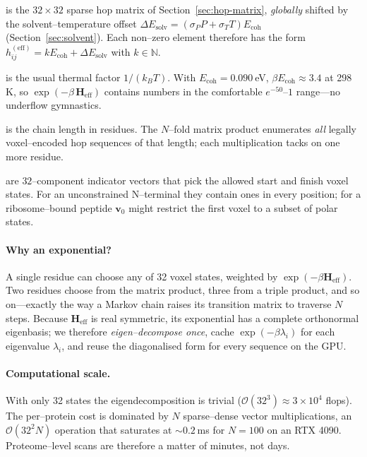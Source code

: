 \documentclass[11pt]{article}
\newcommand{\Eoh}{E_{\mathrm{coh}}}          %
\begin{document}
\begin{description}\setlength\itemsep{3pt}
\item[$\mathbf H_{\text{eff}}$] is the $32\times32$ sparse hop matrix of
      Section~\ref{sec:hop-matrix}, \emph{globally} shifted by the
      solvent–temperature offset
      $\Delta E_{\text{solv}}=(\sigma_{P}P+\sigma_{T}T)\Eoh$
      (Section~\ref{sec:solvent}).
      Each non–zero element therefore has the form
      $h_{ij}^{(\text{eff})}=k\Eoh+\Delta E_{\text{solv}}$ with
      $k\in\mathbb N$.

\item[$\beta$] is the usual thermal factor $1/(k_{B}T)$.  With
      $\Eoh=0.090$ eV, $\beta\Eoh\approx3.4$ at 298 K, so
      $\exp(-\beta\,\mathbf H_{\text{eff}})$ contains numbers in the
      comfortable $e^{-50}\text{–}1$ range—no underflow gymnastics.

\item[$N$] is the chain length in residues.  The $N$–fold matrix product
      enumerates \emph{all} legally voxel–encoded hop sequences of that
      length; each multiplication tacks on one more residue.

\item[$\mathbf v_{0}$, $\mathbf v_{f}$] are $32$–component indicator
      vectors that pick the allowed start and finish voxel states.  For
      an unconstrained N–terminal they contain ones in every position;
      for a ribosome–bound peptide $\mathbf v_{0}$ might restrict the
      first voxel to a subset of polar states.

\end{description}

\paragraph{Why an exponential?}
A single residue can choose any of 32 voxel states, weighted by
$\exp(-\beta\mathbf H_{\text{eff}})$.  Two residues choose from the
matrix product, three from a triple product, and so on—exactly the way a
Markov chain raises its transition matrix to traverse $N$ steps.
Because $\mathbf H_{\text{eff}}$ is real symmetric, its exponential has
a complete orthonormal eigenbasis; we therefore \emph{eigen–decompose
once}, cache $\exp(-\beta\lambda_{i})$ for each eigenvalue $\lambda_{i}$,
and reuse the diagonalised form for every sequence on the GPU.

\paragraph{Computational scale.}
With only 32 states the eigendecomposition is trivial
($\mathcal O(32^{3})\approx3\times10^{4}$ flops).  The per–protein cost
is dominated by $N$ sparse–dense vector multiplications, an
$\mathcal O(32^{2}N)$ operation that saturates at $\sim0.2$ ms for
$N=100$ on an RTX 4090.  Proteome–level scans are therefore a matter of
minutes, not days.
\end{document}
